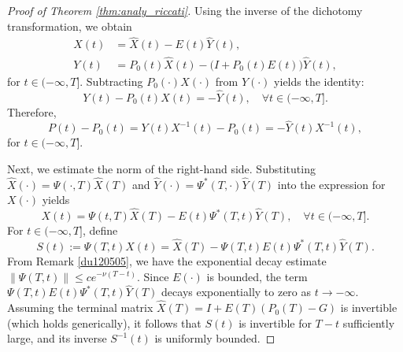 \documentclass[10pt,a4paper]{amsart}
\begin{document}
\begin{proof}[Proof of Theorem \ref{thm:analy_riccati}]
		Using the inverse of the dichotomy transformation, we obtain
		\begin{equation}\label{inv_trans_XY}
			\begin{aligned}
				X(t) &= \hat{X}(t) - E(t)\hat{Y}(t), \\
				Y(t) &= P_0(t)\hat{X}(t) - \big(I+P_0(t)E(t)\big)\hat{Y}(t),
			\end{aligned}
		\end{equation} for $t\in(-\infty,T]$.
		Subtracting $P_0(\cdot)X(\cdot)$ from $Y(\cdot)$ yields the identity:
		\begin{equation}
			Y(t) - P_0(t)X(t) = -\hat{Y}(t),\quad \forall t\in(-\infty,T].
		\end{equation}
		Therefore,
		\begin{equation}\label{P_error_exact}
			P(t) - P_0(t) = Y(t)X^{-1}(t) - P_0(t) = -\hat{Y}(t)X^{-1}(t),
		\end{equation}for $t\in(-\infty,T]$.
		
		Next, we estimate the norm of the right-hand side. Substituting $\hat{X}(\cdot) = \Psi(\cdot,T)\hat{X}(T)$ and $\hat{Y}(\cdot) = \Psi^*(T,\cdot)\hat{Y}(T)$ into the expression for $X(\cdot)$ yields
		\begin{equation}
			X(t) = \Psi(t,T)\hat{X}(T) - E(t)\Psi^*(T,t)\hat{Y}(T),\quad\forall t\in(-\infty,T].
		\end{equation}
		For $t\in(-\infty,T]$, define
		\begin{equation}
			S(t) := \Psi(T,t)X(t) = \hat{X}(T) - \Psi(T,t)E(t)\Psi^*(T,t)\hat{Y}(T).
		\end{equation}
		From Remark \ref{du120505}, we have the exponential decay estimate $\|\Psi(T,t)\| \leq c e^{-\nu(T-t)}$. Since $E(\cdot)$ is bounded, the term $\Psi(T,t)E(t)\Psi^*(T,t)\hat{Y}(T)$ decays exponentially to zero as $t \to -\infty$. Assuming the terminal matrix $\hat{X}(T) = I + E(T)(P_0(T)-G)$ is invertible (which holds generically), it follows that $S(t)$ is invertible for $T-t$ sufficiently large, and its inverse $S^{-1}(t)$ is uniformly bounded. 
		

\end{proof}
\end{document}
